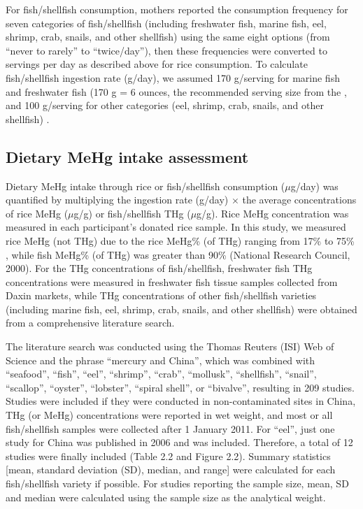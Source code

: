 For fish/shellfish consumption, mothers reported the consumption frequency for seven categories of fish/shellfish (including freshwater fish, marine fish, eel, shrimp, crab, snails, and other shellfish) using the same eight options (from ``never to rarely'' to ``twice/day''), then these frequencies were converted to servings per day as described above for rice consumption. To calculate fish/shellfish ingestion rate (g/day), we assumed 170 g/serving for marine fish and freshwater fish (170 g = 6 ounces, the recommended serving size from the \citep{usfda2011fish}, and 100 g/serving for other categories (eel, shrimp, crab, snails, and other shellfish) \citep{cheng2009assessment}. 

\subsection{Dietary MeHg intake assessment}

Dietary MeHg intake through rice or fish/shellfish consumption (\({\mu}\)g/day) was quantified by multiplying the ingestion rate (g/day) \({\times}\) the average concentrations of rice MeHg (\({\mu}\)g/g) or fish/shellfish THg (\({\mu}\)g/g). Rice MeHg concentration was measured in each participant's donated rice sample. In this study, we measured rice MeHg (not THg) due to the rice MeHg\% (of THg) ranging from 17\% to 75\% \citep{rothenberg2014rice}, while fish MeHg\% (of THg) was greater than 90\% (National Research Council, 2000). For the THg concentrations of fish/shellfish, freshwater fish THg concentrations were measured in freshwater fish tissue samples collected from Daxin markets, while THg concentrations of other fish/shellfish varieties (including marine fish, eel, shrimp, crab, snails, and other shellfish) were obtained from a comprehensive literature search. 

The literature search was conducted using the Thomas Reuters (ISI) Web of Science and the phrase ``mercury and China'', which was combined with ``seafood'', ``fish'', ``eel'', ``shrimp'', ``crab'', ``mollusk'', ``shellfish'', ``snail'', ``scallop'', ``oyster'', ``lobster'', ``spiral shell'', or ``bivalve'', resulting in 209 studies. Studies were included if they were conducted in non-contaminated sites in China, THg (or MeHg) concentrations were reported in wet weight, and most or all fish/shellfish samples were collected after 1 January 2011. For ``eel'', just one study for China was published in 2006 and was included. Therefore, a total of 12 studies were finally included (Table 2.2 and Figure 2.2). Summary statistics [mean, standard deviation (SD), median, and range] were calculated for each fish/shellfish variety if possible. For studies reporting the sample size, mean, SD and median were calculated using the sample size as the analytical weight. 

